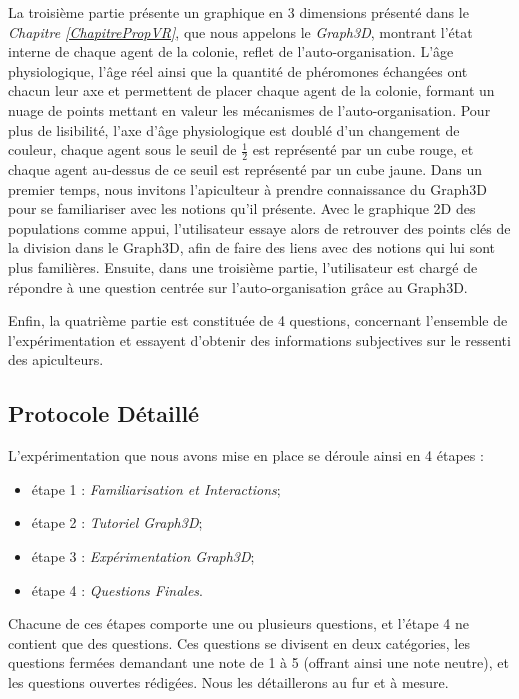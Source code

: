     La troisième partie présente un graphique en 3 dimensions présenté dans le \textit{Chapitre \ref{ChapitrePropVR}}, que nous appelons le \textit{Graph3D}, montrant l'état interne de chaque agent de la colonie, reflet de l'auto-organisation. L'âge physiologique, l'âge réel ainsi que la quantité de phéromones échangées ont chacun leur axe et permettent de placer chaque agent de la colonie, formant un nuage de points mettant en valeur les mécanismes de l'auto-organisation. Pour plus de lisibilité, l'axe d'âge physiologique est doublé d'un changement de couleur, chaque agent sous le seuil de $\frac{1}{2}$ est représenté par un cube rouge, et chaque agent au-dessus de ce seuil est représenté par un cube jaune. Dans un premier temps, nous invitons l'apiculteur à prendre connaissance du Graph3D pour se familiariser avec les notions qu'il présente. Avec le graphique 2D des populations comme appui, l'utilisateur essaye alors de retrouver des points clés de la division dans le Graph3D, afin de faire des liens avec des notions qui lui sont plus familières. Ensuite, dans une troisième partie, l'utilisateur est chargé de répondre à une question centrée sur l'auto-organisation grâce au Graph3D.
    
    Enfin, la quatrième partie est constituée de 4 questions, concernant l'ensemble de l'expérimentation et essayent d'obtenir des informations subjectives sur le ressenti des apiculteurs.

		
		\subsection{Protocole Détaillé}
		
		L'expérimentation que nous avons mise en place se déroule ainsi en 4 étapes :
		\begin{itemize}
			\item étape 1 : \textit{Familiarisation et Interactions};
			\item étape 2 : \textit{Tutoriel Graph3D};
			\item étape 3 : \textit{Expérimentation Graph3D};
			\item étape 4 : \textit{Questions Finales}.
		\end{itemize}
		Chacune de ces étapes comporte une ou plusieurs questions, et l'étape 4 ne contient que des questions. Ces questions se divisent en deux catégories, les questions fermées demandant une note de 1 à 5 (offrant ainsi une note neutre), et les questions ouvertes rédigées. Nous les détaillerons au fur et à mesure.
		
